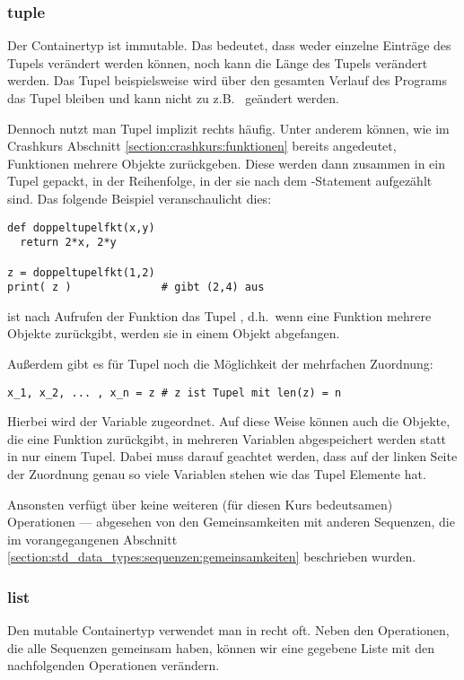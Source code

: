 \subsubsection{tuple}
\label{section:std_data_types:sequenzen:tuple}
Der Containertyp  ist immutable. Das bedeutet, dass weder einzelne Einträge des Tupels verändert werden können,
noch kann die Länge des Tupels verändert werden. Das Tupel  beispielsweise wird über den gesamten Verlauf des
Programs das Tupel  bleiben und kann nicht zu z.B.\  geändert werden.

Dennoch nutzt man Tupel implizit rechts häufig. Unter anderem können, wie im Crash\-kurs Abschnitt \ref{section:crashkurs:funktionen} bereits angedeutet, Funktionen
mehrere Objekte zurückgeben. Diese werden dann zusammen in ein Tupel gepackt, in der Reihenfolge, in der sie nach dem
-Statement aufgezählt sind. Das folgende Beispiel veranschaulicht dies:

\begin{lstlisting}
def doppeltupelfkt(x,y)
  return 2*x, 2*y

z = doppeltupelfkt(1,2)
print( z )              # gibt (2,4) aus
\end{lstlisting}

 ist nach Aufrufen der Funktion das Tupel , d.h.\ wenn eine Funktion mehrere Objekte zurückgibt,
werden sie in einem Objekt abgefangen.

Außerdem gibt es für Tupel noch die Möglichkeit der mehrfachen Zuordnung:

\begin{lstlisting}
x_1, x_2, ... , x_n = z # z ist Tupel mit len(z) = n
\end{lstlisting}

Hierbei wird  der Variable  zugeordnet. Auf diese Weise können auch die Objekte, die eine Funktion
zurückgibt, in mehreren Variablen abgespeichert werden statt in nur einem Tupel. Dabei muss darauf geachtet werden, dass
auf der linken Seite der Zuordnung genau so viele Variablen stehen wie das Tupel Elemente hat.

Ansonsten verfügt  über keine weiteren (für diesen Kurs bedeutsamen) Operationen --- abgesehen von den Gemeinsamkeiten mit
anderen Sequenzen, die im vorangegangenen Abschnitt \ref{section:std_data_types:sequenzen:gemeinsamkeiten} beschrieben wurden.


\subsubsection{list}
\label{section:std_data_types:sequenzen:listen}
Den mutable Containertyp  verwendet man in \Python recht oft.
Neben den Operationen, die alle Sequenzen gemeinsam haben, können wir eine gegebene Liste  mit den nachfolgenden Operationen verändern.

